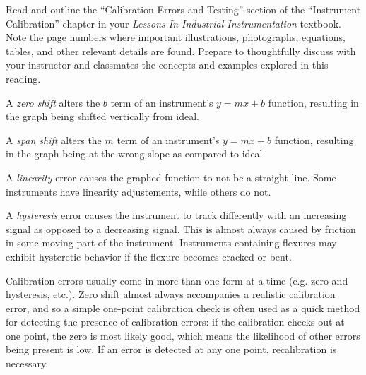 

Read and outline the ``Calibration Errors and Testing'' section of the ``Instrument Calibration'' chapter in your {\it Lessons In Industrial Instrumentation} textbook.  Note the page numbers where important illustrations, photographs, equations, tables, and other relevant details are found.  Prepare to thoughtfully discuss with your instructor and classmates the concepts and examples explored in this reading.














A {\it zero shift} alters the $b$ term of an instrument's $y = mx + b$ function, resulting in the graph being shifted vertically from ideal.

\vskip 10pt

A {\it span shift} alters the $m$ term of an instrument's $y = mx + b$ function, resulting in the graph being at the wrong slope as compared to ideal.

\vskip 10pt

A {\it linearity} error causes the graphed function to not be a straight line.  Some instruments have linearity adjustements, while others do not.

\vskip 10pt

A {\it hysteresis} error causes the instrument to track differently with an increasing signal as opposed to a decreasing signal.  This is almost always caused by friction in some moving part of the instrument.  Instruments containing flexures may exhibit hysteretic behavior if the flexure becomes cracked or bent.

\vskip 10pt

Calibration errors usually come in more than one form at a time (e.g. zero and hysteresis, etc.).  Zero shift almost always accompanies a realistic calibration error, and so a simple one-point calibration check is often used as a quick method for detecting the presence of calibration errors: if the calibration checks out at one point, the zero is most likely good, which means the likelihood of other errors being present is low.  If an error is detected at any one point, recalibration is necessary.

